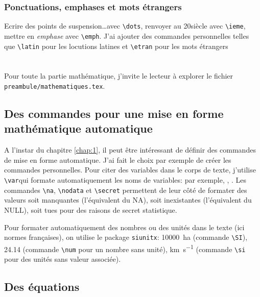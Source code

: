 \subsection{Ponctuations, emphases et mots étrangers}

Ecrire des points de suspension\dots avec \verb!\dots!, renvoyer au 20\ieme siècle avec \verb!\ieme!, mettre en \emph{emphase} avec \verb!\emph!. J'ai ajouter des commandes personnelles telles que \verb!\latin! pour les locutions latines  et \verb!\etran! pour les mots étrangers 
\chapter[Un peu de maths]{ \label{chap:3}}%
\glsresetall

Pour toute la partie mathématique, j'invite le lecteur à explorer le fichier \verb!preambule/mathematiques.tex!.

\section{Des commandes pour une mise en forme mathématique automatique}\label{sec:31}

A l'instar du chapitre \ref{chap:1}, il peut être intéressant de définir des commandes de mise en forme automatique. J'ai fait le choix par exemple de créer les commandes personnelles. Pour citer des variables dans le corps de texte, j'utilise \verb!\var!qui formate automatiquement les noms de variables: par exemple,  , . Les commandes \verb!\na!, \verb!\nodata! et \verb!\secret! permettent de leur côté de formater des valeurs soit manquantes (l'équivalent du NA), soit inexistantes (l'équivalent du NULL), soit tues pour des raisons de secret statistique. 

Pour formater automatiquement des nombres ou des unités dans le texte (ici normes françaises), on  utilise le package \verb!siunitx!:  \SI{10000}{\hectare} (commande \verb!\SI!), \num{24.14} (commande \verb!\num! pour un nombre sans unité), \si{\km\per\second} (commande  \verb!\si! pour des unités sans valeur associée).

\section{Des équations}\label{sec:32}

